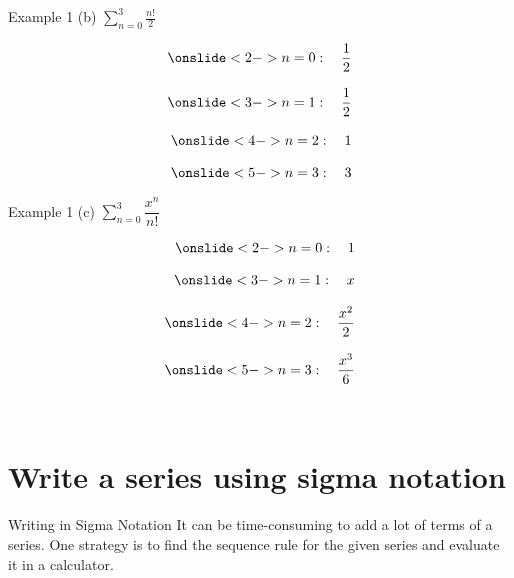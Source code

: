 \documentclass[t,usenames,dvipsnames]{beamer}
\begin{document}
\begin{frame}{Example 1}
(b) \quad $\sum_{n=0}^{3} \frac{n!}{2}$ \newline\\
\begin{minipage}{0.6\textwidth}
\begin{align*}
    \onslide<2->{n = 0: \quad \frac{1}{2}} \\[8pt]
    \onslide<3->{n = 1: \quad \frac{1}{2}} \\[8pt]
    \onslide<4->{n = 2: \quad   1}  \\[8pt]
    \onslide<5->{n = 3: \quad   3}
\end{align*}
\end{minipage}
\begin{minipage}{0.2\textwidth}
\end{minipage}
\end{frame}

\begin{frame}{Example 1}
(c) \quad $\sum_{n=0}^{3} \dfrac{x^n}{n!}$  \newline\\
\begin{minipage}{0.6\textwidth}
\begin{align*}
    \onslide<2->{n = 0: \quad 1} \\[8pt]
    \onslide<3->{n = 1: \quad x} \\[8pt]
    \onslide<4->{n = 2: \quad \frac{x^2}{2}}  \\[8pt]
    \onslide<5->{n = 3: \quad \frac{x^3}{6}}
\end{align*}
\end{minipage}
\begin{minipage}{0.3\textwidth}
 \newline\\
\end{minipage}
\end{frame}

\section{Write a series using sigma notation}

\begin{frame}{Writing in Sigma Notation}
It can be time-consuming to add a lot of terms of a series. One strategy is to find the sequence rule for the given series and evaluate it in a calculator.
\end{frame}
\end{document}
